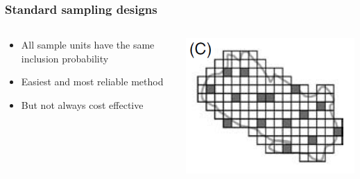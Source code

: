 \documentclass[color=usenames,dvipsnames]{beamer}\usepackage[]{graphicx}\usepackage[]{xcolor}
\begin{document}
\begin{frame}
  \frametitle{Standard sampling designs}
  \large
  {\centering \bf \Large \color{RoyalBlue}{Simple random sampling} \par}
  \vfill
  \begin{columns}
    \large
    \begin{column}{0.6\textwidth}
      \begin{itemize}[<+->]
        \item All sample units have the same inclusion probability
        \item Easiest and most reliable method
        \item But not always cost effective
      \end{itemize}
    \end{column}
    \begin{column}{0.4\textwidth}
      \includegraphics[width=\textwidth]{figs/designC}
    \end{column}
  \end{columns}
\end{frame}


\end{document}
